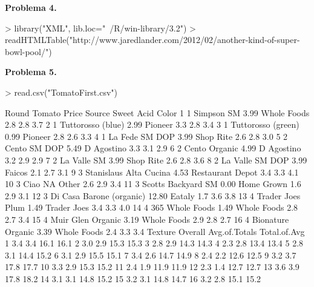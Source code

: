 \documentclass{article}
\begin{document}
\textbf{Problema 4.}

\begin{Schunk}
\begin{Sinput}
> library("XML", lib.loc="~/R/win-library/3.2")
> readHTMLTable("http://www.jaredlander.com/2012/02/another-kind-of-super-bowl-pool/")
\end{Sinput}
\end{Schunk}
\textbf{Problema 5.}
\begin{Schunk}
\begin{Sinput}
> read.csv("TomatoFirst.csv")
\end{Sinput}
\begin{Soutput}
   Round                   Tomato Price           Source Sweet Acid Color
1      1               Simpson SM  3.99      Whole Foods   2.8  2.8   3.7
2      1        Tuttorosso (blue)  2.99          Pioneer   3.3  2.8   3.4
3      1       Tuttorosso (green)  0.99          Pioneer   2.8  2.6   3.3
4      1           La Fede SM DOP  3.99        Shop Rite   2.6  2.8   3.0
5      2             Cento SM DOP  5.49       D Agostino   3.3  3.1   2.9
6      2            Cento Organic  4.99       D Agostino   3.2  2.9   2.9
7      2              La Valle SM  3.99        Shop Rite   2.6  2.8   3.6
8      2          La Valle SM DOP  3.99           Faicos   2.1  2.7   3.1
9      3   Stanislaus Alta Cucina  4.53 Restaurant Depot   3.4  3.3   4.1
10     3                     Ciao    NA            Other   2.6  2.9   3.4
11     3       Scotts Backyard SM  0.00       Home Grown   1.6  2.9   3.1
12     3 Di Casa Barone (organic) 12.80           Eataly   1.7  3.6   3.8
13     4         Trader Joes Plum  1.49      Trader Joes   3.4  3.3   4.0
14     4          365 Whole Foods  1.49      Whole Foods   2.8  2.7   3.4
15     4        Muir Glen Organic  3.19      Whole Foods   2.9  2.8   2.7
16     4        Bionature Organic  3.39      Whole Foods   2.4  3.3   3.4
   Texture Overall Avg.of.Totals Total.of.Avg
1      3.4     3.4          16.1         16.1
2      3.0     2.9          15.3         15.3
3      2.8     2.9          14.3         14.3
4      2.3     2.8          13.4         13.4
5      2.8     3.1          14.4         15.2
6      3.1     2.9          15.5         15.1
7      3.4     2.6          14.7         14.9
8      2.4     2.2          12.6         12.5
9      3.2     3.7          17.8         17.7
10     3.3     2.9          15.3         15.2
11     2.4     1.9          11.9         11.9
12     2.3     1.4          12.7         12.7
13     3.6     3.9          17.8         18.2
14     3.1     3.1          14.8         15.2
15     3.2     3.1          14.8         14.7
16     3.2     2.8          15.1         15.2
\end{Soutput}
\end{Schunk}
\end{document}
